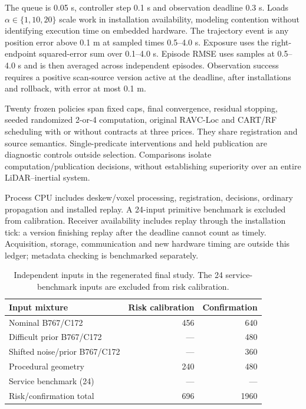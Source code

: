 The queue is 0.05 s, controller step 0.1 s and observation deadline 0.3 s. Loads $\alpha\in\{1,10,20\}$ scale work in installation availability, modeling contention without identifying execution time on embedded hardware. The trajectory event is any position error above 0.1 m at sampled times 0.5--4.0 s. Exposure uses the right-endpoint squared-error sum over 0.1--4.0 s. Episode RMSE uses samples at 0.5--4.0 s and is then averaged across independent episodes. Observation success requires a positive scan-source version active at the deadline, after installations and rollback, with error at most 0.1 m.

Twenty frozen policies span fixed caps, final convergence, residual stopping, seeded randomized 2-or-4 computation, original RAVC-Loc and CART/RF scheduling with or without contracts at three prices. They share registration and source semantics. Single-predicate interventions and held publication are diagnostic controls outside selection. Comparisons isolate computation/publication decisions, without establishing superiority over an entire LiDAR--inertial system.

Process CPU includes deskew/voxel processing, registration, decisions, ordinary propagation and installed replay. A 24-input primitive benchmark is excluded from calibration. Receiver availability includes replay through the installation tick: a version finishing replay after the deadline cannot count as timely. Acquisition, storage, communication and new hardware timing are outside this ledger; metadata checking is benchmarked separately.
\begin{table}[!htbp]\centering\footnotesize
\caption{Independent inputs in the regenerated final study. The 24 service-benchmark inputs are excluded from risk calibration.}\label{tab:splits}
\begin{tabular}{@{}lrr@{}}\toprule
Input mixture & Risk calibration & Confirmation\\\midrule
Nominal B767/C172 & 456 & 640\\
Difficult prior B767/C172 & --- & 480\\
Shifted noise/prior B767/C172 & --- & 360\\
Procedural geometry & 240 & 480\\
Service benchmark (24) & --- & ---\\
Risk/confirmation total & 696 & 1960\\
\bottomrule\end{tabular}\end{table}

